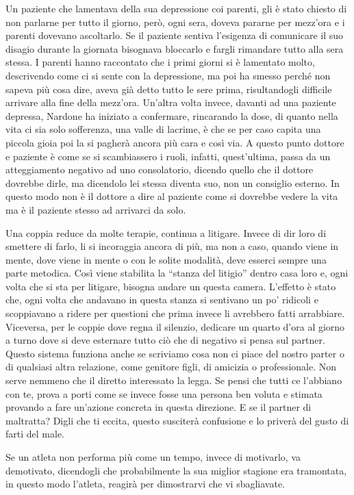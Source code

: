 \documentclass[12pt]{book} %
\begin{document}
\begin{mdframed}[linewidth=1pt]
Un paziente che lamentava della sua depressione coi parenti, gli è stato chiesto di non parlarne per tutto il giorno,
però, ogni sera, doveva pararne per mezz'ora e i parenti dovevano ascoltarlo. Se il paziente
sentiva l'esigenza di comunicare il suo disagio durante la giornata bisognava bloccarlo e fargli
rimandare tutto alla sera stessa. I parenti hanno raccontato che i primi giorni si è lamentato molto, descrivendo come
ci si sente con la depressione, ma poi ha smesso perché non sapeva più cosa dire, aveva già detto tutto le sere prima,
risultandogli difficile arrivare alla fine della mezz'ora. Un'altra volta
invece, davanti ad una paziente depressa, Nardone ha iniziato a confermare, rincarando la dose, di quanto nella vita ci
sia solo sofferenza, una valle di lacrime, è che se per caso capita una piccola gioia poi la si pagherà ancora più cara
e così via. A questo punto dottore e paziente è come se si scambiassero i ruoli, infatti,
quest'ultima, passa da un atteggiamento negativo ad uno consolatorio, dicendo quello che il
dottore dovrebbe dirle, ma dicendolo lei stessa diventa suo, non un consiglio esterno. In questo modo non è il dottore
a dire al paziente come si dovrebbe vedere la vita ma è il paziente stesso ad arrivarci da solo.

Una coppia reduce da molte terapie, continua a litigare. Invece di dir loro di smettere di farlo, li si incoraggia
ancora di più, ma non a caso, quando viene in mente, dove viene in mente o con le solite modalità, deve esserci sempre
una parte metodica. Così viene stabilita la “stanza del litigio” dentro casa loro e, ogni volta che si sta per
litigare, bisogna andare un questa camera. L'effetto è stato che, ogni volta che andavano in questa stanza si sentivano
un po' ridicoli e scoppiavano a ridere per questioni che prima invece li avrebbero fatti arrabbiare. Viceversa, per le
coppie dove regna il silenzio, dedicare un quarto d'ora al giorno a turno dove si deve esternare
tutto ciò che di negativo si pensa sul partner. Questo sistema funziona anche se scriviamo cosa non ci piace del nostro
parter o di qualsiasi altra relazione, come genitore figli, di amicizia o professionale. Non serve nemmeno che il
diretto interessato la legga. Se pensi che tutti ce l'abbiano con te, prova a porti come se invece fosse una persona
ben voluta e stimata provando a fare un'azione concreta in questa direzione. E se il partner di maltratta? Digli che ti
eccita, questo susciterà confusione e lo priverà del gusto di farti del male.

Se un atleta non performa più come un tempo, invece di motivarlo, va demotivato, dicendogli che probabilmente la sua
miglior stagione era tramontata, in questo modo l'atleta, reagirà per dimostrarvi che vi sbagliavate. 


\end{mdframed}
\end{document}
